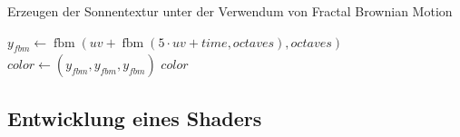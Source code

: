 \begin{algorithm}
  \caption{Erzeugen der Sonnentextur unter der Verwendum von Fractal Brownian
  Motion}
  \label{alg:suntexture}

  $y_\mathit{fbm} \leftarrow \operatorname{fbm}(\mathit{uv} +
    \operatorname{fbm}(5 \cdot \mathit{uv} + \mathit{time}, \mathit{octaves}),
    \mathit{octaves})$\;
  $\mathit{color} \leftarrow (y_\mathit{fbm}, y_\mathit{fbm}, y_\mathit{fbm})$\;
  \Return $\mathit{color}$\;
\end{algorithm}


\subsection{Entwicklung eines Shaders}
